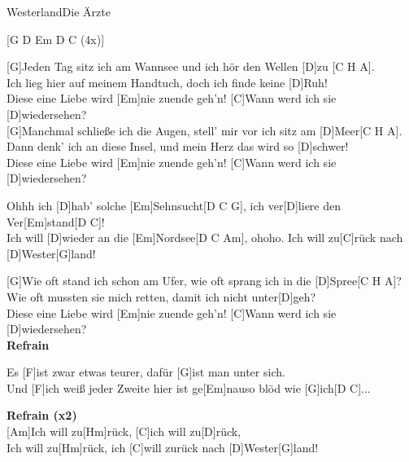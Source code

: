 \begin{song}{Westerland}{Die Ärzte}
    \begin{guitarMagic}

        [G D Em D C (4x)]
        
        [G]Jeden Tag sitz ich am Wannsee und ich hör den Wellen [D]zu [C H A]. \\
        [G]Ich lieg hier auf meinem Handtuch, doch ich finde keine [D]Ruh! \\
        [C]Diese eine Liebe wird [Em]nie zuende geh'n! [C]Wann werd ich sie [D]wiedersehen? \\
        
        [G]Manchmal schließe ich die Augen, stell' mir vor ich sitz am [D]Meer[C H A]. \\
        [G]Dann denk' ich an diese Insel, und mein Herz das wird so [D]schwer! \\
        [C]Diese eine Liebe wird [Em]nie zuende geh'n! [C]Wann werd ich sie [D]wiedersehen? 

        \begin{chorus}
            [G]Ohhh ich [D]hab' solche [Em]Sehnsucht[D C G], 
            \hspace{1em}ich ver[D]liere den Ver[Em]stand[D C]! \\
            [G]Ich will [D]wieder an die [Em]Nordsee[D C Am], \hspace{1.5 em}ohoho. 
            Ich will zu[C]rück nach [D]Wester[G]land!
        \end{chorus}

        [G]Wie oft stand ich schon am Ufer, wie oft sprang ich in die [D]Spree[C H A]? \\
        [G]Wie oft mussten sie mich retten, damit ich nicht unter[D]geh? \\
        [C]Diese eine Liebe wird [Em]nie zuende geh'n! [C]Wann werd ich sie [D]wiedersehen? \\
        
        \textbf{Refrain}
        
        \begin{bridge}
            Es [F]ist zwar etwas teurer, dafür [G]ist man unter sich. \\
            Und [F]ich weiß jeder Zweite hier ist ge[Em]nauso blöd wie [G]ich[D C]... \\
        \end{bridge}
        
        \textbf{Refrain (x2)} \\
        
        [Am]Ich will zu[Hm]rück, [C]ich will zu[D]rück,\\
        [Am]Ich will zu[Hm]rück, ich [C]will zurück nach [D]Wester[G]land!\\

    \end{guitarMagic}
\end{song}
